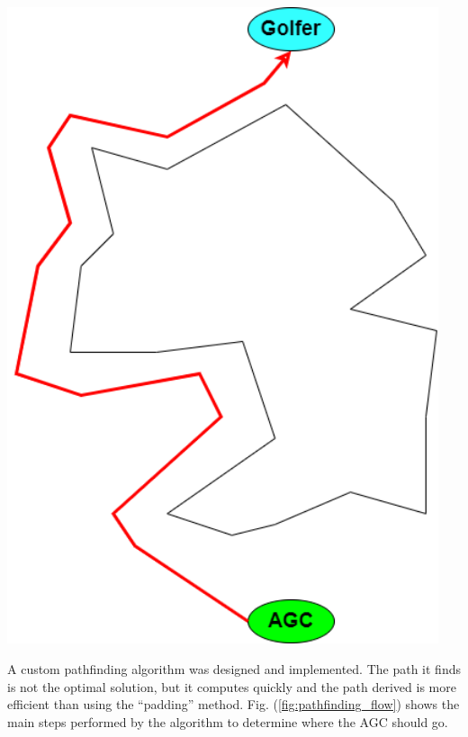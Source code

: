\documentclass[11pt,landscape]{article}
\newenvironment{Figure}
  {\par\medskip\noindent\minipage{\linewidth}}
  {\endminipage\par\medskip}
\begin{document}
\begin{multicols}{3}
\begin{Figure}
    \begin{mdframed}
        \begin{center}
            \includegraphics[width=0.95\textwidth]{padding.png}
        \end{center}
    \end{mdframed}
    \label{fig:padding}
\end{Figure}

A custom pathfinding algorithm was designed and implemented. The path it finds
is not the optimal solution, but it computes quickly and the path derived is
more efficient than using the ``padding'' method. Fig.
(\ref{fig:pathfinding_flow}) shows the main steps performed by the algorithm to
determine where the AGC should go.


\end{multicols}
\end{document}
